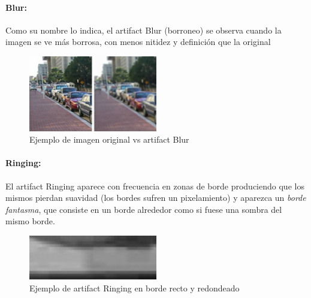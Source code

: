 \paragraph{Blur:}
Como su nombre lo indica, el artifact Blur (borroneo) se observa cuando la imagen se ve más borrosa, con menos nitidez y definición que la original

\begin{figure}[htb]
\begin{center}
       \includegraphics[width=0.5\textwidth]{imagenes/blur_example.jpg}
       \caption{Ejemplo de imagen original vs artifact Blur}
       \end{center}

\end{figure}


\paragraph{Ringing:}
El artifact Ringing aparece con frecuencia en zonas de borde  produciendo que los mismos pierdan suavidad (los bordes sufren un pixelamiento) y aparezca un \textit{borde fantasma}, que consiste en un borde alrededor como si fuese una sombra del mismo borde.

\begin{figure}[htb]
\begin{center}
       \includegraphics[width=0.5\textwidth]{imagenes/ringing_example.jpg}
       \caption{Ejemplo de artifact Ringing en borde recto y redondeado}
       \end{center}

\end{figure}

